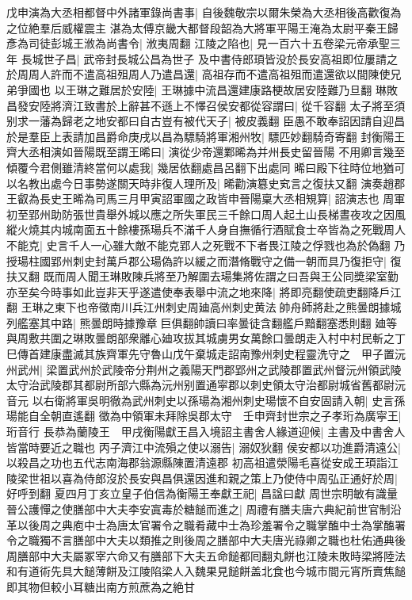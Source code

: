 戊申演為大丞相都督中外諸軍錄尚書事|{
	自後魏敬宗以爾朱榮為大丞相後高歡復為之位絶羣后威權震主}
湛為太傅京畿大都督段韶為大將軍平陽王淹為太尉平秦王歸彥為司徒彭城王浟為尚書令|{
	浟夷周翻}
江陵之陷也|{
	見一百六十五卷梁元帝承聖三年}
長城世子昌|{
	武帝封長城公昌為世子}
及中書侍郎頊皆没於長安高祖即位屢請之於周周人許而不遣高祖殂周人乃遣昌還|{
	高祖存而不遣高祖殂而遣還欲以間陳使兄弟爭國也}
以王琳之難居於安陸|{
	王琳據中流昌還建康路梗故居安陸難乃旦翻}
琳敗昌發安陸將濟江致書於上辭甚不遜上不懌召侯安都從容謂曰|{
	從千容翻}
太子將至須别求一藩為歸老之地安都曰自古豈有被代天子|{
	被皮義翻}
臣愚不敢奉詔因請自迎昌於是羣臣上表請加昌爵命庚戌以昌為驃騎將軍湘州牧|{
	驃匹妙翻騎奇寄翻}
封衡陽王　齊大丞相演如晉陽既至謂王晞曰|{
	演從少帝還鄴晞為并州長史留晉陽}
不用卿言幾至傾覆今君側雖清終當何以處我|{
	幾居依翻處昌呂翻下出處同}
晞曰殿下往時位地猶可以名教出處今日事勢遂關天時非復人理所及|{
	晞勸演簒史䆒言之復扶又翻}
演奏趙郡王叡為長史王晞為司馬三月甲寅詔軍國之政皆申晉陽稟大丞相䂓算|{
	詔演志也}
周軍初至郢州助防張世貴舉外城以應之所失軍民三千餘口周人起土山長梯晝夜攻之因風縱火燒其内城南面五十餘樓孫瑒兵不滿千人身自撫循行酒賦食士卒皆為之死戰周人不能克|{
	史言千人一心雖大敵不能克郢人之死戰不下者畏江陵之俘戮也為於偽翻}
乃授瑒柱國郢州刺史封萬戶郡公瑒偽許以緩之而潛脩戰守之備一朝而具乃復拒守|{
	復扶又翻}
既而周人聞王琳敗陳兵將至乃解圍去瑒集將佐謂之曰吾與王公同奬梁室勤亦至矣今時事如此豈非天乎遂遣使奉表舉中流之地來降|{
	將即亮翻使疏吏翻降戶江翻}
王琳之東下也帝徵南川兵江州刺史周廸高州刺史黄法帥舟師將赴之熊曇朗據城列艦塞其中路|{
	熊曇朗時據豫章巨俱翻帥讀曰率曇徒含翻艦戶黯翻塞悉則翻}
廸等與周敷共圍之琳敗曇朗部衆離心廸攻拔其城虜男女萬餘口曇朗走入村中村民斬之丁巳傳首建康盡滅其族齊軍先守魯山戊午棄城走詔南豫州刺史程靈洗守之　甲子置沅州武州|{
	梁置武州於武陵帝分荆州之義陽天門郡郢州之武陵郡置武州督沅州領武陵太守治武陵郡其都尉所部六縣為沅州别置通寜郡以刺史領太守治都尉城省舊都尉沅音元}
以右衛將軍吳明徹為武州刺史以孫瑒為湘州刺史瑒懷不自安固請入朝|{
	史言孫瑒能自全朝直遙翻}
徵為中領軍未拜除吳郡太守　壬申齊封世宗之子孝珩為廣寜王|{
	珩音行}
長恭為蘭陵王　甲戌衡陽獻王昌入境詔主書舍人緣道迎候|{
	主書及中書舍人皆當時要近之職也}
丙子濟江中流殞之使以溺告|{
	溺奴狄翻}
侯安都以功進爵清遠公|{
	以殺昌之功也五代志南海郡翁源縣陳置清遠郡}
初高祖遣滎陽毛喜從安成王頊詣江陵梁世祖以喜為侍郎沒於長安與昌俱還因進和親之策上乃使侍中周弘正通好於周|{
	好呼到翻}
夏四月丁亥立皇子伯信為衡陽王奉獻王祀|{
	昌諡曰獻}
周世宗明敏有識量晉公護憚之使膳部中大夫李安寘毒於糖䭔而進之|{
	周禮有膳夫唐六典紀前世官制沿革以後周之典庖中士為唐太官署令之職肴藏中士為珍羞署令之職掌醢中士為掌醢署令之職獨不言膳部中大夫以類推之則後周之膳部中大夫唐光祿卿之職也杜佑通典後周膳部中大夫屬冢宰六命又有膳部下大夫五命䭔都囘翻丸餅也江陵未敗時梁將陸法和有道術先具大䭔薄餅及江陵陷梁人入魏果見䭔餅盖北食也今城市間元宵所賣焦䭔即其物但較小耳糖出南方煎蔗為之絶甘}

